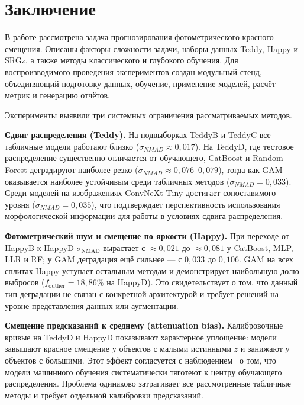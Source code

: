 \documentclass[12pt,a4paper]{article}
\begin{document}
\clearpage
\section*{Заключение}

В работе рассмотрена задача прогнозирования фотометрического красного смещения. Описаны факторы сложности задачи, наборы данных Teddy, Happy и SRGz, а также методы классического и глубокого обучения. Для воспроизводимого проведения экспериментов создан модульный стенд, объединяющий подготовку данных, обучение, применение моделей, расчёт метрик и генерацию отчётов.

Эксперименты выявили три системных ограничения рассматриваемых методов.

\textbf{Сдвиг распределения (Teddy).} На подвыборках TeddyB и TeddyC все табличные модели работают близко ($\sigma_{NMAD} \approx 0{,}017$). На TeddyD, где тестовое распределение существенно отличается от обучающего, CatBoost и Random Forest деградируют наиболее резко ($\sigma_{NMAD} \approx 0{,}076$–$0{,}079$), тогда как GAM оказывается наиболее устойчивым среди табличных методов ($\sigma_{NMAD} = 0{,}033$). Среди моделей на изображениях ConvNeXt-Tiny достигает сопоставимого уровня ($\sigma_{NMAD} = 0{,}035$), что подтверждает перспективность использования морфологической информации для работы в условиях сдвига распределения.

\textbf{Фотометрический шум и смещение по яркости (Happy).} При переходе от HappyB к HappyD $\sigma_{\mathrm{NMAD}}$ вырастает с $\approx 0{,}021$ до $\approx 0{,}081$ у CatBoost, MLP, LLR и RF; у GAM деградация ещё сильнее — с $0{,}033$ до $0{,}106$. GAM на всех сплитах Happy уступает остальным методам и демонстрирует наибольшую долю выбросов ($f_{\mathrm{outlier}} = 18{,}86\%$ на HappyD). Это свидетельствует о том, что данный тип деградации не связан с конкретной архитектурой и требует решений на уровне представления данных или аугментации.

\textbf{Смещение предсказаний к среднему (attenuation bias).} Калибровочные кривые на TeddyD и HappyD показывают характерное уплощение: модели завышают красное смещение у объектов с малыми истинными $z$ и занижают у объектов с большими. Этот эффект согласуется с наблюдением~\cite{ting2025} о том, что модели машинного обучения систематически тяготеют к центру обучающего распределения. Проблема одинаково затрагивает все рассмотренные табличные методы и требует отдельной калибровки предсказаний.
\end{document}
